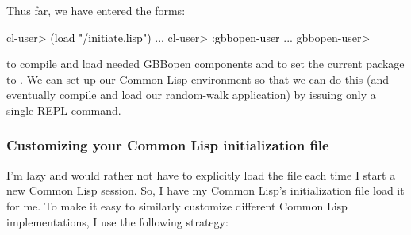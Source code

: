 \documentclass[10pt,twoside,english,pdftex]{article}
\begin{document}
Thus far, we have entered the forms:
%
\W\supp
\begin{example}
\textcolor{darkergray}{%
  cl-user> \textcolor{black}{(load "/initiate.lisp")}
     ...
  cl-user> \textcolor{black}{:gbbopen-user}
     ...
  gbbopen-user>}
\end{example}
%
to compile and load needed GBBopen components and to set the current package
to .  We can set up our Common Lisp environment so
that we can do this (and eventually compile and load our random-walk
application) by issuing only a single REPL command.

\subsubsection*{Customizing your Common Lisp initialization file}

I'm lazy and would rather not have to explicitly load the
 file each time I start a new
Common Lisp session.  So, I have my Common Lisp's initialization file load it
for me.  To make it easy to similarly customize different Common Lisp
implementations, I use the following strategy:
\end{document}
